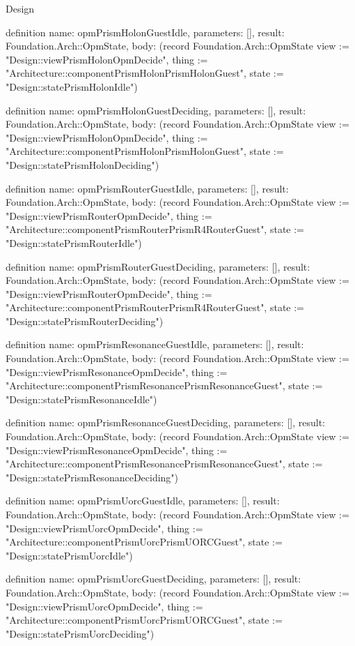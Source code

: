 \begin{lexlean}{Design}
\begin{semanticmodule}
definition{
  name: opmPrismHolonGuestIdle,
  parameters: [],
  result: Foundation.Arch::OpmState,
  body: (record Foundation.Arch::OpmState {view := "Design::viewPrismHolonOpmDecide", thing := "Architecture::componentPrismHolonPrismHolonGuest", state := "Design::statePrismHolonIdle"})
}

definition{
  name: opmPrismHolonGuestDeciding,
  parameters: [],
  result: Foundation.Arch::OpmState,
  body: (record Foundation.Arch::OpmState {view := "Design::viewPrismHolonOpmDecide", thing := "Architecture::componentPrismHolonPrismHolonGuest", state := "Design::statePrismHolonDeciding"})
}

definition{
  name: opmPrismRouterGuestIdle,
  parameters: [],
  result: Foundation.Arch::OpmState,
  body: (record Foundation.Arch::OpmState {view := "Design::viewPrismRouterOpmDecide", thing := "Architecture::componentPrismRouterPrismR4RouterGuest", state := "Design::statePrismRouterIdle"})
}

definition{
  name: opmPrismRouterGuestDeciding,
  parameters: [],
  result: Foundation.Arch::OpmState,
  body: (record Foundation.Arch::OpmState {view := "Design::viewPrismRouterOpmDecide", thing := "Architecture::componentPrismRouterPrismR4RouterGuest", state := "Design::statePrismRouterDeciding"})
}

definition{
  name: opmPrismResonanceGuestIdle,
  parameters: [],
  result: Foundation.Arch::OpmState,
  body: (record Foundation.Arch::OpmState {view := "Design::viewPrismResonanceOpmDecide", thing := "Architecture::componentPrismResonancePrismResonanceGuest", state := "Design::statePrismResonanceIdle"})
}

definition{
  name: opmPrismResonanceGuestDeciding,
  parameters: [],
  result: Foundation.Arch::OpmState,
  body: (record Foundation.Arch::OpmState {view := "Design::viewPrismResonanceOpmDecide", thing := "Architecture::componentPrismResonancePrismResonanceGuest", state := "Design::statePrismResonanceDeciding"})
}

definition{
  name: opmPrismUorcGuestIdle,
  parameters: [],
  result: Foundation.Arch::OpmState,
  body: (record Foundation.Arch::OpmState {view := "Design::viewPrismUorcOpmDecide", thing := "Architecture::componentPrismUorcPrismUORCGuest", state := "Design::statePrismUorcIdle"})
}

definition{
  name: opmPrismUorcGuestDeciding,
  parameters: [],
  result: Foundation.Arch::OpmState,
  body: (record Foundation.Arch::OpmState {view := "Design::viewPrismUorcOpmDecide", thing := "Architecture::componentPrismUorcPrismUORCGuest", state := "Design::statePrismUorcDeciding"})
}


\end{semanticmodule}
\end{lexlean}
